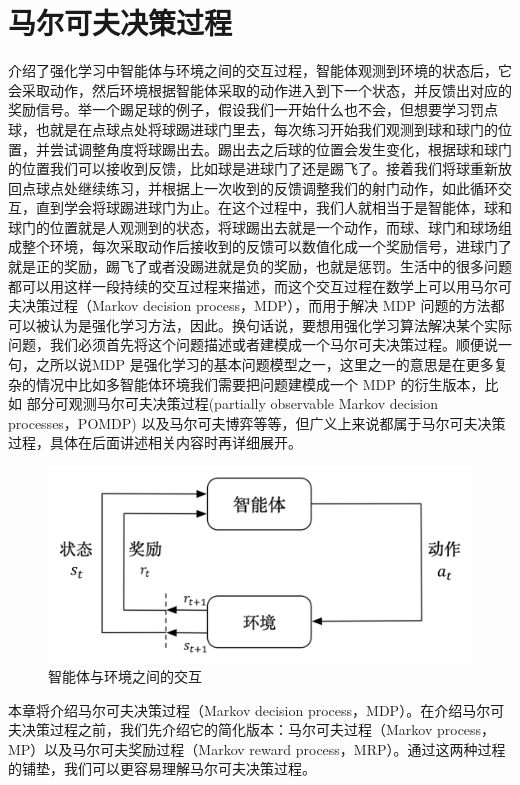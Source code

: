 \section{马尔可夫决策过程}

 介绍了强化学习中智能体与环境之间的交互过程，智能体观测到环境的状态后，它会采取动作，然后环境根据智能体采取的动作进入到下一个状态，并反馈出对应的奖励信号。举一个踢足球的例子，假设我们一开始什么也不会，但想要学习罚点球，也就是在点球点处将球踢进球门里去，每次练习开始我们观测到球和球门的位置，并尝试调整角度将球踢出去。踢出去之后球的位置会发生变化，根据球和球门的位置我们可以接收到反馈，比如球是进球门了还是踢飞了。接着我们将球重新放回点球点处继续练习，并根据上一次收到的反馈调整我们的射门动作，如此循环交互，直到学会将球踢进球门为止。在这个过程中，我们人就相当于是智能体，球和球门的位置就是人观测到的状态，将球踢出去就是一个动作，而球、球门和球场组成整个环境，每次采取动作后接收到的反馈可以数值化成一个奖励信号，进球门了就是正的奖励，踢飞了或者没踢进就是负的奖励，也就是惩罚。生活中的很多问题都可以用这样一段持续的交互过程来描述，而这个交互过程在数学上可以用马尔可夫决策过程（Markov decision process，MDP），而用于解决 MDP 问题的方法都可以被认为是强化学习方法，因此。换句话说，要想用强化学习算法解决某个实际问题，我们必须首先将这个问题描述或者建模成一个马尔可夫决策过程。顺便说一句，之所以说MDP 是强化学习的基本问题模型之一，这里之一的意思是在更多复杂的情况中比如多智能体环境我们需要把问题建模成一个 MDP 的衍生版本，比如 部分可观测马尔可夫决策过程(partially observable Markov decision processes，POMDP) 以及马尔可夫博弈等等，但广义上来说都属于马尔可夫决策过程，具体在后面讲述相关内容时再详细展开。


\begin{figure}[hbt]
  \centering
  \includegraphics[width=0.5\linewidth]{ch2/figs/rl_pic.png}
  \caption{智能体与环境之间的交互}
  \label{fig:rl_pic}
\end{figure}


本章将介绍马尔可夫决策过程（Markov decision process，MDP）。在介绍马尔可夫决策过程之前，我们先介绍它的简化版本：马尔可夫过程（Markov process，MP）以及马尔可夫奖励过程（Markov reward process，MRP）。通过这两种过程的铺垫，我们可以更容易理解马尔可夫决策过程。
